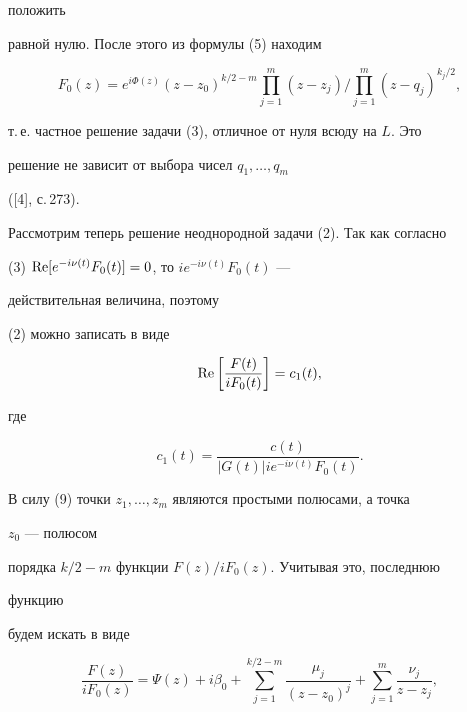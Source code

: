 положить 


равной нулю. После этого из формулы (5) находим 


\begin{equation} 


F_0(z)=e^{i\Phi(z)}(z-z_0)^{k/2-m} 


\prod^m_{j=1}(z-z_j)\Big/\prod^m_{j=1} 


(z-q_j)^{k_j/2}, 


\end{equation} 


т.\,е. частное решение задачи (3), отличное от нуля всюду на $L$. Это 


решение не зависит от выбора чисел $q_1,\dotsc,q_m$ 


([4], с.\,273). 


 


Рассмотрим теперь решение неоднородной задачи (2). Так как согласно 


(3)\; $\operatorname{Re}[e^{-i\nu(t)}F_0(t)]=0$, то $ie^{-i\nu(t)}F_0(t)$ --- 


действительная величина, поэтому 


(2) можно записать в виде 


\begin{equation} 


\re\bigg[\frac{F(t)}{i F_0(t)}\bigg]=c_1(t), 


\end{equation} 


где 


\begin{equation} 


c_1(t)=\frac{c(t)}{|G(t)|ie^{-i\nu(t)}F_0(t)}. 


\end{equation} 


В силу (9) точки $z_1,\dotsc,z_m$ являются простыми полюсами, а точка 


$z_0$ --- полюсом 


порядка $k/2-m$ функции $F(z)/i F_0(z)$. Учитывая это, последнюю 


функцию 


будем искать в виде 


\begin{equation} 


\frac{F(z)}{i F_0(z)}=\Psi(z)+i\beta_0 


+\sum^{k/2-m}_{j=1}\frac{\mu_j}{(z-z_0)^j}+ 


\sum^m_{j=1}\frac{\nu_j}{z-z_j}, 


\end{equation} 


